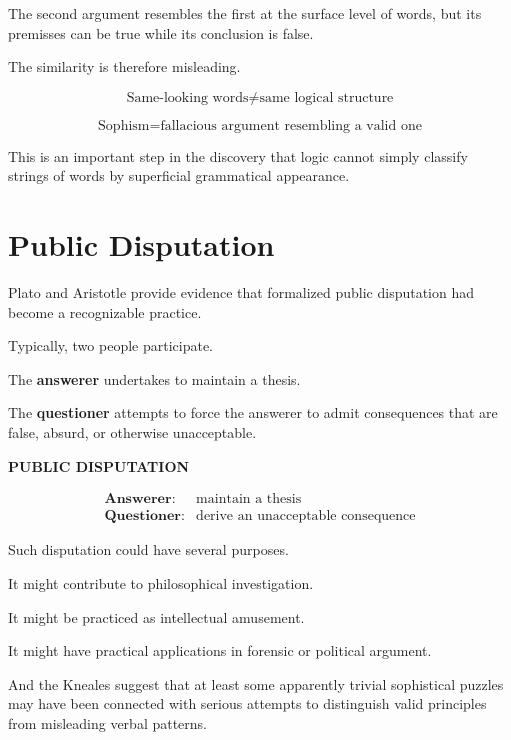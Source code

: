 \documentclass[11pt]{article}
\begin{document}
The second argument resembles the first at the surface level of
words, but its premisses can be true while its conclusion is
false.

The similarity is therefore misleading.

\begin{whiteboard}
\[
\boxed{
\text{Same-looking words}
\neq
\text{same logical structure}
}
\]

\[
\text{Sophism}
=
\text{fallacious argument resembling a valid one}
\]
\end{whiteboard}

This is an important step in the discovery that logic cannot
simply classify strings of words by superficial grammatical
appearance.

\section{Public Disputation}

Plato and Aristotle provide evidence that formalized public
disputation had become a recognizable practice.

Typically, two people participate.

The \textbf{answerer} undertakes to maintain a thesis.

The \textbf{questioner} attempts to force the answerer to admit
consequences that are false, absurd, or otherwise unacceptable.

\newpage

\begin{whiteboard}
\textbf{PUBLIC DISPUTATION}

\[
\begin{array}{ll}
\textbf{Answerer:}
&
\text{maintain a thesis}
\\[0.6em]
\textbf{Questioner:}
&
\text{derive an unacceptable consequence}
\end{array}
\]
\end{whiteboard}

Such disputation could have several purposes.

It might contribute to philosophical investigation.

It might be practiced as intellectual amusement.

It might have practical applications in forensic or political
argument.

And the Kneales suggest that at least some apparently trivial
sophistical puzzles may have been connected with serious attempts
to distinguish valid principles from misleading verbal patterns.
\end{document}
